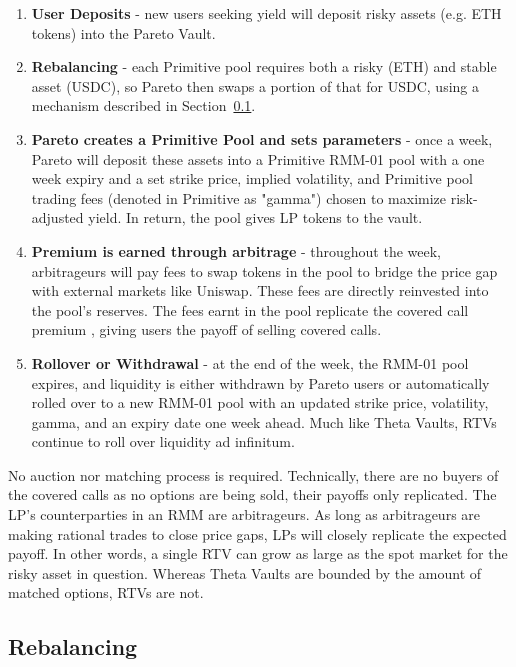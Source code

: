 \documentclass[hidelinks, 12pt]{article}
\begin{document}
\begin{enumerate}
    \item \textbf{User Deposits} - new users seeking yield will deposit risky assets (e.g. ETH tokens) into the Pareto Vault. 
    \item \textbf{Rebalancing} - each Primitive pool requires both a risky (ETH) and stable asset (USDC), so Pareto then swaps a portion of that for USDC, using a mechanism described in Section~\ref{sec:rebalance}.  
    \item \textbf{Pareto creates a Primitive Pool and sets parameters} - once a week, Pareto will deposit these assets into a Primitive RMM-01 pool with a one week expiry and a set strike price, implied volatility, and Primitive pool trading fees (denoted in Primitive as "gamma") chosen to maximize risk-adjusted yield. In return, the pool gives LP tokens to the vault.
    \item \textbf{Premium is earned through arbitrage} - throughout the week, arbitrageurs will pay fees to swap tokens in the pool to bridge the price gap with external markets like Uniswap. These fees are directly reinvested into the pool's reserves. The fees earnt in the pool replicate the covered call premium \cite{angeris2021replicating}, giving users the payoff of selling covered calls.
    \item \textbf{Rollover or Withdrawal} - at the end of the week, the RMM-01 pool expires, and liquidity is either withdrawn by Pareto users or automatically rolled over to a new RMM-01 pool with an updated strike price, volatility, gamma, and an expiry date one week ahead. Much like Theta Vaults, RTVs continue to roll over liquidity ad infinitum.
\end{enumerate}

No auction nor matching process is required. Technically, there are no buyers of the covered calls as no options are being sold, their payoffs only replicated. The LP's counterparties in an RMM are arbitrageurs. As long as arbitrageurs are making rational trades to close price gaps, LPs will closely replicate the expected payoff. In other words, a single RTV can grow as large as the spot market for the risky asset in question. Whereas Theta Vaults are bounded by the amount of matched options, RTVs are not.

\subsection{Rebalancing}
\label{sec:rebalance}
\end{document}
